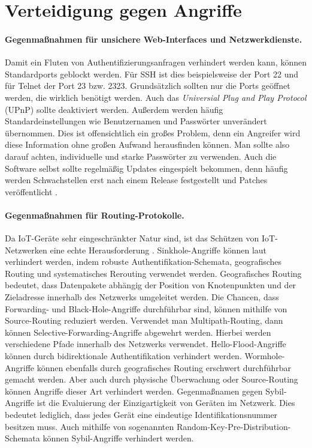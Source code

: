 \section{Verteidigung gegen Angriffe}

\paragraph{Gegenmaßnahmen für unsichere Web-Interfaces und Netzwerkdienste.}
Damit ein Fluten von Authentifizierungsanfragen verhindert werden kann, können
Standardports geblockt werden. Für SSH ist dies beispielsweise der Port 22 und
für Telnet der Port 23 bzw. 2323. Grundsätzlich sollten nur die Ports
geöffnet werden, die wirklich benötigt werden. Auch das \textit{Universial Plug
and Play Protocol} (UPnP) sollte deaktiviert werden. Außerdem werden häufig
Standardeinstellungen wie Benutzernamen und Passwörter unverändert übernommen.
Dies ist offensichtlich ein großes Problem, denn ein Angreifer wird diese
Information ohne großen Aufwand herausfinden können. Man sollte also darauf
achten, individuelle und starke Passwörter zu verwenden. Auch die Software
selbst sollte regelmäßig Updates eingespielt bekommen, denn häufig werden
Schwachstellen erst nach einem Release festgestellt und Patches
veröffentlicht \cite{paper}.

\paragraph{Gegenmaßnahmen für Routing-Protokolle.}
Da IoT-Geräte sehr eingeschränkter Natur sind, ist das Schützen von
IoT-Netzwerken eine echte Herausforderung \cite{patel2016}. Sinkhole-Angriffe
können laut \cite{paper} verhindert werden, indem robuste
Authentifikation-Schemata, geografisches Routing und systematisches Rerouting
verwendet werden.  Geografisches Routing bedeutet, dass Datenpakete abhängig der
Position von Knotenpunkten und der Zieladresse innerhalb des Netzwerks
umgeleitet werden.  Die Chancen, dass Forwarding- und Black-Hole-Angriffe
durchführbar sind, können mithilfe von Source-Routing reduziert werden.
Verwendet man Multipath-Routing, dann können Selective-Forwarding-Angriffe
abgewehrt werden. Hierbei werden verschiedene Pfade innerhalb des Netzwerks
verwendet. Hello-Flood-Angriffe können durch bidirektionale Authentifikation
verhindert werden.  Wormhole-Angriffe können ebenfalls durch geografisches
Routing erschwert durchführbar gemacht werden. Aber auch durch physische
Überwachung oder Source-Rou\-ting können Angriffe dieser Art verhindert werden.
Gegenmaßnamen gegen Sybil-Angriffe ist die Evaluierung der Einzigartigkeit von
Geräten im Netzwerk.  Dies bedeutet lediglich, dass jedes Gerät eine eindeutige
Identifikationsnummer besitzen muss. Auch mithilfe von sogenannten
Random-Key-Pre-Dis\-tri\-bu\-tion-Schemata \cite{chan2003} können Sybil-Angriffe
verhindert werden.

